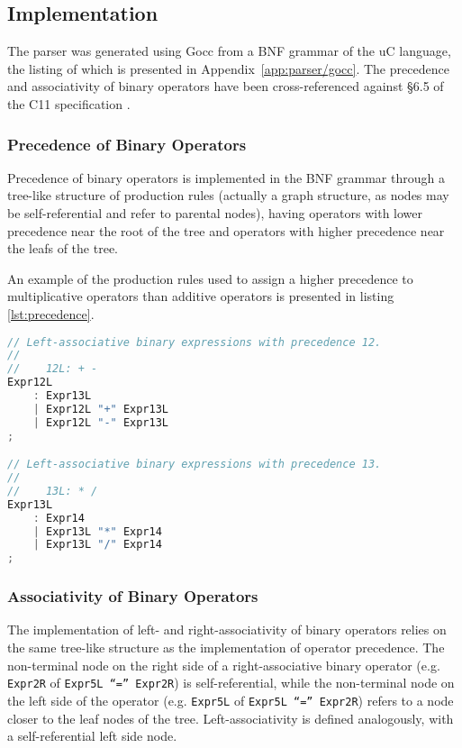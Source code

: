 \subsection{Implementation}

The parser was generated using Gocc from a BNF grammar of the uC language, the listing of which is presented in Appendix~\ref{app:parser/gocc}. The precedence and associativity of binary operators have been cross-referenced against §6.5 of the C11 specification \cite{c11_spec}.


\subsubsection{Precedence of Binary Operators}

Precedence of binary operators is implemented in the BNF grammar through a tree-like structure of production rules (actually a graph structure, as nodes may be self-referential and refer to parental nodes), having operators with lower precedence near the root of the tree and operators with higher precedence near the leafs of the tree.

An example of the production rules used to assign a higher precedence to multiplicative operators than additive operators is presented in listing \ref{lst:precedence}.

\begin{lstlisting}[language=go,style=go,caption={\label{lst:precedence}Precedence of binary expressions.}]
// Left-associative binary expressions with precedence 12.
//
//    12L: + -
Expr12L
	: Expr13L
	| Expr12L "+" Expr13L
	| Expr12L "-" Expr13L
;

// Left-associative binary expressions with precedence 13.
//
//    13L: * /
Expr13L
	: Expr14
	| Expr13L "*" Expr14
	| Expr13L "/" Expr14
;
\end{lstlisting}

\subsubsection{Associativity of Binary Operators}

The implementation of left- and right-associativity of binary operators relies on the same tree-like structure as the implementation of operator precedence. The non-terminal node on the right side of a right-associative binary operator (e.g. \texttt{Expr2R} of \texttt{Expr5L ``='' Expr2R}) is self-referential, while the non-terminal node on the left side of the operator (e.g. \texttt{Expr5L} of \texttt{Expr5L ``='' Expr2R}) refers to a node closer to the leaf nodes of the tree. Left-associativity is defined analogously, with a self-referential left side node.

